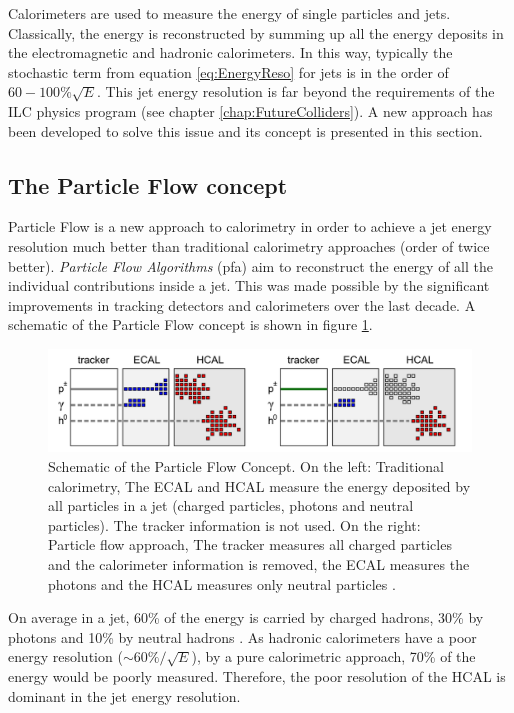 Calorimeters are used to measure the energy of single particles and jets. Classically, the energy is reconstructed by summing up all the energy deposits in the electromagnetic and hadronic calorimeters. In this way, typically the stochastic term from equation \ref{eq:EnergyReso} for jets is in the order of $60-100\%\sqrt{E}$. This jet energy resolution is far beyond the requirements of the ILC physics program (see chapter \ref{chap:FutureColliders}). A new approach has been developed to solve this issue and its concept is presented in this section.

\subsection{The Particle Flow concept}

Particle Flow is a new approach to calorimetry in order to achieve a jet energy resolution much better than traditional calorimetry approaches (order of twice better). \textit{Particle Flow Algorithms} (\acrshort{pfa}) aim to reconstruct the energy of all the individual contributions inside a jet. This was made possible by the significant improvements in tracking detectors and calorimeters over the last decade. A schematic of the Particle Flow concept is shown in figure \ref{fig:PFAConcept}.

\begin{figure}[htbp!]
  \centering
  \includegraphics[width=1\linewidth]{chap2/fig/PFAConcept.png}
  \caption{Schematic of the Particle Flow Concept. On the left: Traditional calorimetry, The ECAL and HCAL measure the energy deposited by all particles in a jet (charged particles, photons and neutral particles). The tracker information is not used. On the right: Particle flow approach, The tracker measures all charged particles and the calorimeter information is removed, the ECAL measures the photons and the HCAL measures only neutral particles \cite{Feege:2011dsa}.} \label{fig:PFAConcept}
\end{figure}

On average in a jet, 60\% of the energy is carried by charged hadrons, 30\% by photons and 10\% by neutral hadrons \cite{Ebrahimi:394104}. As hadronic calorimeters have a poor energy resolution ($\sim 60\%/\sqrt{E}$), by a pure calorimetric approach, 70\% of the energy would be poorly measured. Therefore, the poor resolution of the HCAL is dominant in the jet energy resolution.

